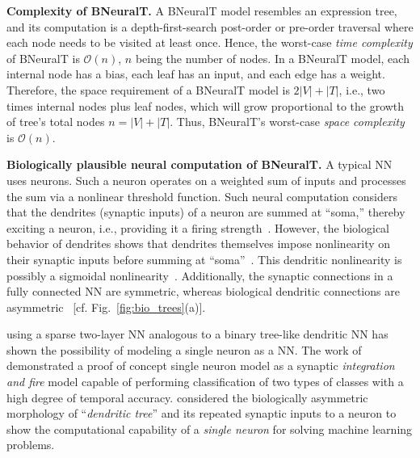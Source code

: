 \documentclass[11pt,a4paper]{article}
\begin{document}
    \textbf{Complexity of BNeuralT.} A BNeuralT model resembles an expression tree, and its computation is a depth-first-search post-order or pre-order traversal where each node needs to be visited at least once. Hence, the worst-case \textit{time complexity} of BNeuralT is $ \mathcal{O}(n) $, $n$ being the number of nodes. In a BNeuralT model, each internal node has a bias, each leaf has an input, and each edge has a weight. Therefore, the space requirement of a BNeuralT model is $2|V|+|T|$, i.e., two times internal nodes plus leaf nodes, which will grow  proportional to the growth of tree's total nodes $n = |V|+|T|$. Thus, BNeuralT's worst-case \textit{space complexity} is $ \mathcal{O}(n) $.
    

    \textbf{Biologically plausible neural computation of BNeuralT.} A typical NN uses \cite{mcculloch1943logical} neurons. Such a neuron operates on a weighted sum of inputs and processes the sum via a nonlinear threshold function. Such neural computation considers that the dendrites (synaptic inputs) of a neuron are summed at ``soma,'' thereby exciting a neuron, i.e., providing it a firing strength~\citep{mcculloch1943logical,hodgkin1952quantitative,poirazi2003arithmetic}. However, the biological behavior of dendrites shows that dendrites themselves impose nonlinearity on their synaptic inputs before summing at ``soma''~\citep{london2005dendritic,hay2011models}. This dendritic nonlinearity is possibly a sigmoidal nonlinearity~\citep{poirazi2003pyramidal}. Additionally, the synaptic connections in a fully connected NN are symmetric, whereas biological dendritic connections are asymmetric~\citep{mel2016toward,travis2005regional,farhoodi2018sampling} [cf. Fig.~\ref{fig:bio_trees}(a)].

    \cite{poirazi2003pyramidal} using a sparse two-layer NN analogous to a binary tree-like  dendritic NN has shown the possibility of modeling a single neuron as a NN. The work of  \cite{beniaguev2020single} demonstrated a proof of concept single neuron model as a synaptic \textit{integration and fire} model capable of performing classification of two types of classes with a high degree of temporal accuracy. \cite{jones2021might} considered the biologically asymmetric morphology of ``\textit{dendritic tree}'' and its repeated synaptic inputs to a neuron to show the computational capability of a \textit{single neuron} for solving machine learning problems. 
        
\end{document}
